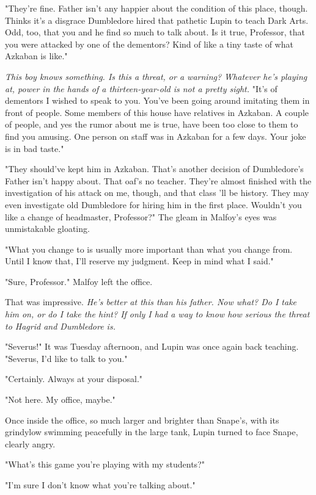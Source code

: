 "They're fine. Father isn't any happier about the condition of this place, though. Thinks it's a disgrace Dumbledore hired that pathetic Lupin to teach Dark Arts. Odd, too, that you and he find so much to talk about. Is it true, Professor, that you were attacked by one of the dementors? Kind of like a tiny taste of what Azkaban is like."

\emph{This boy knows something. Is this a threat, or a warning? Whatever he's playing at, power in the hands of a thirteen-year-old is not a pretty sight.} "It's of dementors I wished to speak to you. You've been going around imitating them in front of people. Some members of this house have relatives in Azkaban. A couple of people, and yes the rumor about me is true, have been too close to them to find you amusing. One person on staff was in Azkaban for a few days. Your joke is in bad taste."

"They should've kept him in Azkaban. That's another decision of Dumbledore's Father isn't happy about. That oaf's no teacher. They're almost finished with the investigation of his attack on me, though, and that class 'll be history. They may even investigate old Dumbledore for hiring him in the first place. Wouldn't you like a change of headmaster, Professor?" The gleam in Malfoy's eyes was unmistakable gloating.

"What you change to is usually more important than what you change from. Until I know that, I'll reserve my judgment. Keep in mind what I said."

"Sure, Professor." Malfoy left the office.

That was impressive. \emph{He's better at this than his father. Now what? Do I take him on, or do I take the hint? If only I had a way to know how serious the threat to Hagrid and Dumbledore is.}

\sbreak

"Severus!" It was Tuesday afternoon, and Lupin was once again back teaching. "Severus, I'd like to talk to you."

"Certainly. Always at your disposal."

"Not here. My office, maybe."

Once inside the office, so much larger and brighter than Snape's, with its grindylow swimming peacefully in the large tank, Lupin turned to face Snape, clearly angry.

"What's this game you're playing with my students?"

"I'm sure I don't know what you're talking about."

